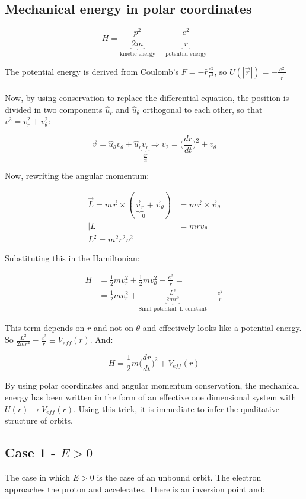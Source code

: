   \subsection{Mechanical energy in polar coordinates}

  $$H = \underbrace{\frac{p^2}{2m}}_{\text{kinetic energy}}-\underbrace{\frac{e^2}{r}}_{\text{potential energy}}$$

  The potential energy is derived from Coulomb's $F=-\hat{r}\frac{e^2}{r^2}$, so $U(|\vec{r}|) = -\frac{e^2}{|\vec{r}|}$


  Now, by using conservation to replace the differential equation, the position is divided in two components $\hat{u}_r$ and $\hat{u}_\theta$ orthogonal to each other, so that $v^2 = v_r^2+v_\theta^2$:

  $$\vec{v} = \hat{u}_\theta v_\theta +\hat{u}_r\underbrace{v_r}_{\frac{d{r}}{d{t}}}\Rightarrow v_2 = \biggl(\frac{d{r}}{d{t}}\biggr)^2+v_\theta$$

  Now, rewriting the angular momentum:

  \begin{align*}
    \vec{L} = m \vec{r}\times(\underbrace{\vec{v}_r}_{=0}+\vec{v}_\theta) &= m \vec{r}\times\vec{v}_\theta\\
    |L| &= mrv_\theta\\
    L^2 = m^2r^2v^2
  \end{align*}

  Substituting this in the Hamiltonian:

  \begin{align*}
    H &= \frac{1}{2}mv_r^2 + \frac{1}{2}mv_\theta^2 - \frac{e^2}{r}=\\
      &=\frac{1}{2}mv_r^2 + \underbrace{\frac{L^2}{2mr^2}}_{\text{Simil-potential, L constant}} - \frac{e^2}{r}
  \end{align*}
  
  This term depends on $r$ and not on $\theta$ and effectively looks like a potential energy.
  So $\frac{L^2}{2mr^2}-\frac{e^2}{r}\equiv V_{eff}(r)$.
  And:

  $$H = \frac{1}{2}m\biggl(\frac{d{r}}{d{t}}\biggr)^2+V_{eff}(r)$$

  By using polar coordinates and angular momentum conservation, the mechanical energy has been written in the form of an effective one dimensional system with $U(r) \rightarrow V_{eff}(r)$.
  Using this trick, it is immediate to infer the qualitative structure of orbits.

  \subsection{Case 1 - $E>0$}
  The case in which $E>0$ is the case of an unbound orbit.
  The electron approaches the proton and accelerates.
  There is an inversion point and:

